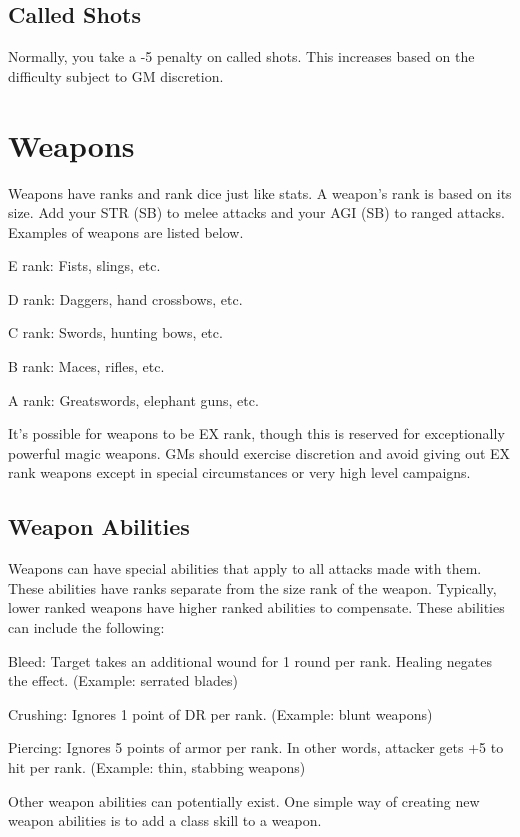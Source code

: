 \begin{multicols}{2}
\subsection{Called Shots}
Normally, you take a -5 penalty on called shots. This increases based on the difficulty subject to GM discretion.

\section{Weapons}

Weapons have ranks and rank dice just like stats. A weapon's rank is based on its size. Add your STR (SB) to melee attacks and your AGI (SB) to ranged attacks. Examples of weapons are listed below.

\begin{wldescription}
\item [E rank:] Fists, slings, etc.
\item [D rank:] Daggers, hand crossbows, etc.
\item [C rank:] Swords, hunting bows, etc.
\item [B rank:] Maces, rifles, etc.
\item [A rank:] Greatswords, elephant guns, etc.
\end{wldescription}
It's possible for weapons to be EX rank, though this is reserved for exceptionally powerful magic weapons. GMs should exercise discretion and avoid giving out EX rank weapons except in special circumstances or very high level campaigns.


\subsection{Weapon Abilities}
Weapons can have special abilities that apply to all attacks made with them. These abilities have ranks separate from the size rank of the weapon. Typically, lower ranked weapons have higher ranked abilities to compensate. These abilities can include the following:
\begin{wldescription}
\item [Bleed:] Target takes an additional wound for 1 round per rank. Healing negates the effect. (Example: serrated blades)
\item [Crushing:] Ignores 1 point of DR per rank. (Example: blunt weapons)
\item [Piercing:] Ignores 5 points of armor per rank. In other words, attacker gets +5 to hit per rank. (Example: thin, stabbing weapons)
\end{wldescription}
Other weapon abilities can potentially exist. One simple way of creating new weapon abilities is to add a class skill to a weapon.


\end{multicols}
